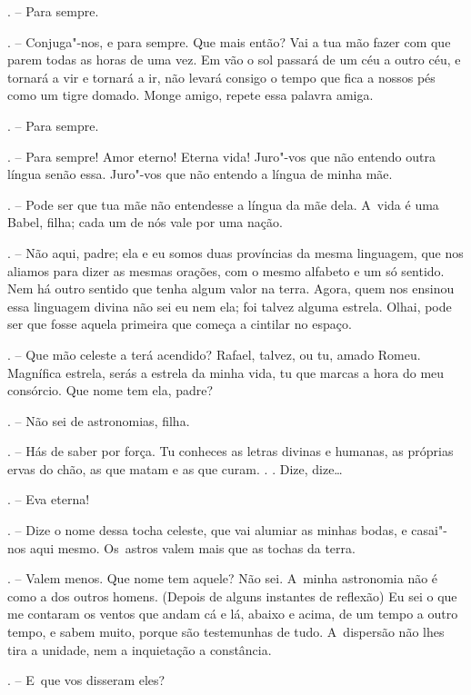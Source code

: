 \begin{Parskip}
. -- Para sempre.

. -- Conjuga"-nos, e para sempre. Que mais então? Vai a tua mão
fazer com que parem todas as horas de uma vez. Em vão o sol passará de
um céu a outro céu, e tornará a vir e tornará a ir, não levará consigo o
tempo que fica a nossos pés como um tigre domado. Monge amigo, repete
essa palavra amiga.

. -- Para sempre.

. -- Para sempre! Amor eterno! Eterna vida! Juro"-vos que não
entendo outra língua senão essa. Juro"-vos que não entendo a língua de
minha mãe.

. -- Pode ser que tua mãe não entendesse a língua da mãe
dela. A~vida é uma Babel, filha; cada um de nós vale por uma nação.

. -- Não aqui, padre; ela e eu somos duas províncias da mesma
linguagem, que nos aliamos para dizer as mesmas orações, com o mesmo
alfabeto e um só sentido. Nem há outro sentido que tenha algum valor na
terra. Agora, quem nos ensinou essa linguagem divina não sei eu nem ela;
foi talvez alguma estrela. Olhai, pode ser que fosse aquela primeira que
começa a cintilar no espaço.

. -- Que mão celeste a terá acendido? Rafael, talvez, ou tu,
amado Romeu. Magnífica estrela, serás a estrela da minha vida, tu que
marcas a hora do meu consórcio. Que nome tem ela, padre?

. -- Não sei de astronomias, filha.

. -- Hás de saber por força. Tu conheces as letras divinas e
humanas, as próprias ervas do chão, as que matam e as que curam. . .
Dize, dize\ldots{}

. -- Eva eterna!

. -- Dize o nome dessa tocha celeste, que vai alumiar as minhas
bodas, e casai"-nos aqui mesmo. Os~astros valem mais que as tochas da
terra.

. -- Valem menos. Que nome tem aquele? Não sei. A~minha
astronomia não é como a dos outros homens. (Depois de alguns instantes
de reflexão) Eu sei o que me contaram os ventos que andam cá e lá,
abaixo e acima, de um tempo a outro tempo, e sabem muito, porque são
testemunhas de tudo. A~dispersão não lhes tira a unidade, nem a
inquietação a constância.

. -- E~que vos disseram eles?


\end{Parskip}
